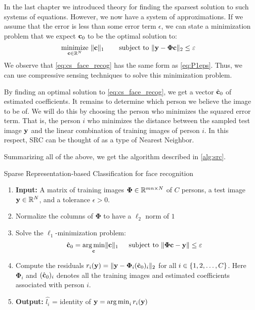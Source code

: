 In the last chapter we introduced theory for finding the sparsest solution to such systems of equations. However, we now have a system of approximations. If we assume that the error is less than some error term $ \epsilon $, we can state a minimization problem that we expect $ \mathbf{c}_{0} $ to be the optimal solution to:
\begin{equation}
	\label{eq:cs_face_recog}
	\underset{\mathbf{c} \in \mathbb{R}^{N}}{\text{minimize}}~ \lVert\mathbf{c}\rVert_{1} \quad\quad\operatorname*{subject~to}~ \lVert\mathbf{y} - \mathbf{\Phi}\mathbf{c}\rVert_{2} \leq \varepsilon
\end{equation}
We observe that \eqref{eq:cs_face_recog} has the same form as \eqref{eq:P1eps}. Thus, we can use compressive sensing techniques to solve this minimization problem. 

By finding an optimal solution to \eqref{eq:cs_face_recog}, we get a vector $ \hat{\mathbf{c}}_{0} $ of estimated coefficients. It remains to determine which person we believe the image to be of. We will do this by choosing the person who minimizes the squared error term. That is, the person $ i $ who minimizes the distance between the sampled test image $ \mathbf{y} $ and the linear combination of training images of person $ i $. In this respect, SRC can be thought of as a type of Nearest Neighbor. 

Summarizing all of the above, we get the algorithm described in \cref{alg:src}. 



\begin{algorithm}[tb]
	\caption{Sparse Representation-based Classification for face recognition}
	\label{alg:src}
	\begin{enumerate}
		\itemsep0em 
		\renewcommand{\parsep}{0pt}
		\renewcommand{\parskip}{0pt}
		\renewcommand{\itemsep}{0pt}
		\item[] \textbf{Input:} A matrix of training images $ \mathbf{\Phi} \in \mathbb{R}^{mn\times N} $ of $ C $ persons, a test image $ \mathbf{y}\in\mathbb{R}^{N} $, and a tolerance $ \epsilon > 0 $.
		\item Normalize the columns of $ \mathbf{\Phi} $ to have a $ \ell_{2} $ norm of $ 1 $
		\item Solve the $ \ell_{1} $-minimization problem:
		\begin{equation}
			\hat{\mathbf{c}}_{0} = \operatorname*{arg\,min}_{\mathbf{c}} \lVert\mathbf{c}\rVert_{1} ~\quad\operatorname*{subject~to}~ \lVert\mathbf{\Phi}\mathbf{c} - \mathbf{y}\rVert \leq \varepsilon
			\label{eq:src}
		\end{equation}
		\item Compute the residuals $ r_{i}(\mathbf{y}) = \lVert\mathbf{y} - \mathbf{\Phi}_{i}(\hat{\mathbf{c}}_{0})_{i}\rVert_{2} $ for all $ i \in \{1, 2, \ldots, C\} $. Here $ \mathbf{\Phi}_{i} $ and $ (\hat{\mathbf{c}}_{0})_{i} $ denotes all the training images and estimated coefficients associated with person $ i $. 
		\item[] \textbf{Output:} $ \hat{l_{i}} $ = identity of $ \mathbf{y} = \operatorname*{arg\,min}_{i} r_{i}(\mathbf{y}) $  
	\end{enumerate}
\end{algorithm}


